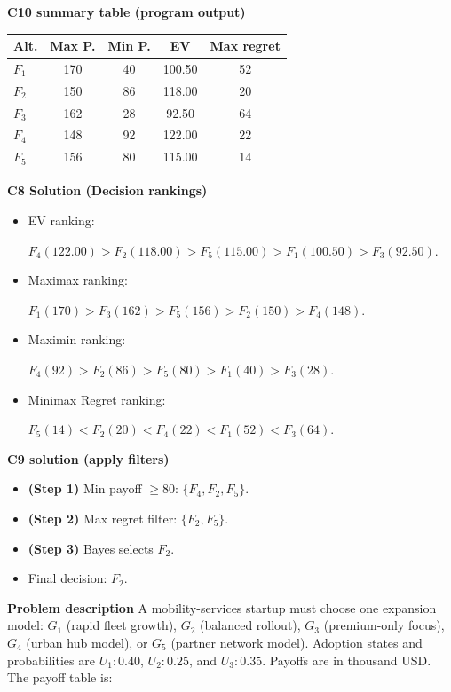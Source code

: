 \begin{ExamProblems}
		\textbf{C10 summary table (program output)}\par
		\begin{center}
			\begin{tabular}{l c c c c}
				\hline
				Alt. & Max P. & Min P. & EV & Max regret \\
				\hline
				$F_1$ & 170 & 40 & 100.50 & 52 \\
				$F_2$ & 150 & 86 & 118.00 & 20 \\
				$F_3$ & 162 & 28 & 92.50 & 64 \\
				$F_4$ & 148 & 92 & 122.00 & 22 \\
				$F_5$ & 156 & 80 & 115.00 & 14 \\
				\hline
			\end{tabular}
		\end{center}
		
		\textbf{C8 Solution (Decision rankings)}\par
		\begin{itemize}
			\item EV ranking: \par $F_4(122.00)>F_2(118.00)>F_5(115.00)>F_1(100.50)>F_3(92.50)$.
			\item Maximax ranking:\par $F_1(170)>F_3(162)>F_5(156)>F_2(150)>F_4(148)$.
			\item Maximin ranking: \par $F_4(92)>F_2(86)>F_5(80)>F_1(40)>F_3(28)$.
			\item Minimax Regret ranking:\par $F_5(14)<F_2(20)<F_4(22)<F_1(52)<F_3(64)$.
		\end{itemize}
		
		\textbf{C9 solution (apply filters)}\par
		\begin{itemize}
			\item \textbf{(Step 1)} Min payoff $\geq 80$: $\{F_4,F_2,F_5\}$.
			\item \textbf{(Step 2)} Max regret filter: $\{F_2,F_5\}$.
			\item \textbf{(Step 3)} Bayes selects $F_2$.
			\item Final decision: $F_2$.
		\end{itemize}
		
		\newpage
		\item
		\textbf{Problem description}
		A mobility-services startup must choose one expansion model: $G_1$ (rapid fleet growth), $G_2$ (balanced rollout), $G_3$ (premium-only focus), $G_4$ (urban hub model), or $G_5$ (partner network model).
		Adoption states and probabilities are $U_1:0.40$, $U_2:0.25$, and $U_3:0.35$. Payoffs are in thousand USD. The payoff table is:
		

\end{ExamProblems}
